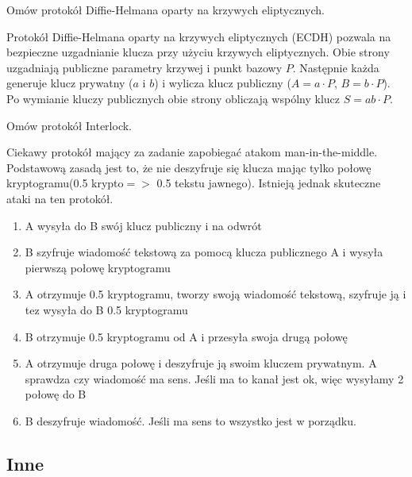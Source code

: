 \documentclass[answers,11pt]{exam}
\begin{document}
\begin{questions}
\question Omów protokół Diffie-Helmana oparty na krzywych eliptycznych.
\begin{solution}
Protokół Diffie-Helmana oparty na krzywych eliptycznych (ECDH) pozwala na bezpieczne uzgadnianie klucza przy użyciu krzywych eliptycznych. Obie strony uzgadniają publiczne parametry krzywej i punkt bazowy \(P\). Następnie każda generuje klucz prywatny (\(a\) i \(b\)) i wylicza klucz publiczny (\(A = a \cdot P\), \(B = b \cdot P\)). Po wymianie kluczy publicznych obie strony obliczają wspólny klucz \(S = ab \cdot P\).

\end{solution}

\question Omów protokół Interlock.
\begin{solution}
Ciekawy protokół mający za zadanie zapobiegać atakom man-in-the-middle. Podstawową zasadą jest to, że nie deszyfruje się klucza mając tylko połowę kryptogramu(0.5 krypto$=>$ 0.5 tekstu jawnego). Istnieją jednak skuteczne ataki na ten protokół.

\begin{enumerate}
\item A wysyła do B swój klucz publiczny i na odwrót
\item B szyfruje wiadomość tekstową za pomocą klucza publicznego A i wysyła pierwszą połowę kryptogramu
\item A otrzymuje 0.5 kryptogramu, tworzy swoją wiadomość tekstową, szyfruje ją i tez wysyła do B 0.5 kryptogramu
\item B otrzymuje 0.5 kryptogramu od A i przesyła swoja drugą połowę
\item A otrzymuje druga połowę i deszyfruje ją swoim kluczem prywatnym. A sprawdza czy wiadomość ma sens. Jeśli ma to kanał jest ok, więc wysyłamy 2 połowę do B
\item B deszyfruje wiadomość. Jeśli ma sens to wszystko jest w porządku.
\end{enumerate}

\end{solution}


\end{questions}


\subsection{Inne}
\end{document}
